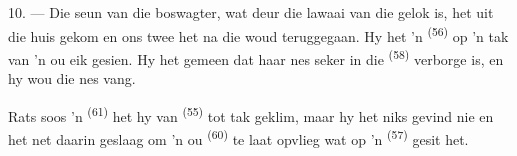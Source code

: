 10. --- Die seun van die boswagter, wat deur die lawaai van die 
gelok is, het uit die huis gekom en ons twee het na die woud teruggegaan. Hy het 'n
 \textsuperscript{(56)} op 'n tak van 'n ou eik gesien. Hy het gemeen dat
haar nes seker in die  \textsuperscript{(58)} verborge is, en hy wou die nes
vang.

Rats soos 'n  \textsuperscript{(61)} het hy van 
\textsuperscript{(55)} tot tak geklim, maar hy het niks gevind nie en het net daarin
geslaag om 'n ou  \textsuperscript{(60)} te laat opvlieg wat op 'n
 \textsuperscript{(57)} gesit het.
\VUsaut{4.0mm}
\VUfilet{22mm}
